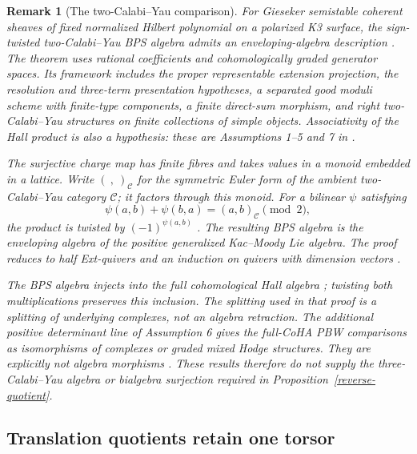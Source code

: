 \documentclass[11pt]{article}
\newtheorem{remark}[theorem]{Remark}
\begin{document}
\begin{remark}[The two-Calabi--Yau comparison]
For Gieseker semistable coherent sheaves of fixed normalized Hilbert
polynomial on a polarized K3 surface, the sign-twisted two-Calabi--Yau
BPS algebra admits an enveloping-algebra description
\cite[\S1.4.1, Theorems 1.1--1.2]{DavisonHennecartSchlegelMejia2025}.
The theorem uses rational coefficients and cohomologically graded
generator spaces. Its framework includes the proper representable
extension projection, the resolution and three-term presentation
hypotheses, a separated good moduli scheme with finite-type components,
a finite direct-sum morphism, and right two-Calabi--Yau structures on
finite collections of simple objects. Associativity of the Hall product
is also a hypothesis: these are Assumptions 1--5 and 7 in
\cite[\S\S4.2--4.3, 6.1, 7.7.3]{DavisonHennecartSchlegelMejia2025}.

The surjective charge map has finite fibres and takes values in a monoid
embedded in a lattice. Write $(\ ,\ )_{\mathcal C}$ for the symmetric
Euler form of the ambient two-Calabi--Yau category $\mathcal C$; it
factors through this monoid.
For a bilinear $\psi$ satisfying
\[
 \psi(a,b)+\psi(b,a)=(a,b)_{\mathcal C}\pmod2,
\]
the product is twisted by $(-1)^{\psi(a,b)}$
\cite[\S\S4.4, 6.3.1]{DavisonHennecartSchlegelMejia2025}.
The resulting BPS algebra is the enveloping algebra of the positive
generalized Kac--Moody Lie algebra. The proof reduces to half Ext-quivers
and an induction on quivers with dimension vectors
\cite[\S7.7.2]{DavisonHennecartSchlegelMejia2025}.

The BPS algebra injects into the full cohomological Hall algebra
\cite[Proposition 6.4]{DavisonHennecartSchlegelMejia2025}; twisting both
multiplications preserves this inclusion. The splitting used in that
proof is a splitting of underlying complexes, not an algebra retraction.
The additional positive determinant line of Assumption 6 gives the
full-CoHA PBW comparisons as isomorphisms of complexes or graded mixed
Hodge structures. They are explicitly not algebra morphisms
\cite[\S4.6, Theorem 1.7, Corollary 1.8 and the following paragraph,
\S8.3.2]{DavisonHennecartSchlegelMejia2025}.
These results therefore do not supply the three-Calabi--Yau algebra or
bialgebra surjection required in Proposition~\ref{reverse-quotient}.
\end{remark}

\subsection{Translation quotients retain one torsor}
\end{document}
